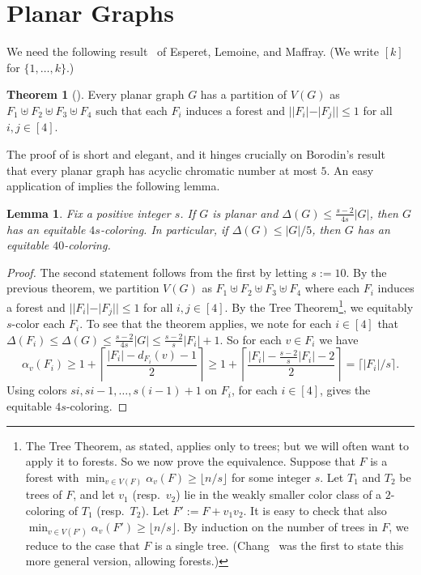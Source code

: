 \documentclass[11pt]{article}
\newtheorem{lem}{Lemma}
\theoremstyle{definition}
\newtheorem{thmA}{Theorem}
\newcommand\floor[1]{\lfloor#1\rfloor}
\newcommand\ceil[1]{\lceil#1\rceil}
\renewcommand\ge\geqslant
\renewcommand\le\leqslant
\begin{document}
\section{Planar Graphs}
\label{planar-sec}
We need the following result~\cite{ELM} of Esperet, Lemoine, and Maffray. (We write $[k]$ for $\{1,\ldots,k\}$.)
\begin{thmA}[\cite{ELM}]
	\label{ELM-thm}
	Every planar graph $G$ has a partition of $V(G)$ as $F_1\uplus F_2\uplus F_3\uplus F_4$ such that each $F_i$ induces a forest and 
	$||F_i|-|F_j||\le 1$ for all $i,j\in[4]$.
\end{thmA}
	The proof of  is short and elegant, and it hinges crucially on Borodin's result~\cite{borodin-5acyclic} that every planar graph has 
	acyclic chromatic number at most $5$.  An easy application of  implies the following lemma.
\begin{lem}
	Fix a positive integer $s$. If $G$ is planar and $\Delta(G)\le \frac{s-2}{4s}|G|$, then $G$ has an equitable $4s$-coloring.
	In particular, if $\Delta(G)\le |G|/5$, then $G$ has an equitable $40$-coloring.
	\label{planar-lem}
\end{lem}
\begin{proof}
	The second statement follows from the first by letting $s:=10$.
	By the previous theorem, we partition $V(G)$ as $F_1\uplus F_2\uplus F_3\uplus F_4$ where each $F_i$ induces a forest and $||F_i|-|F_j||\le 1$
	for all $i,j\in[4]$.  By the Tree Theorem\footnote{The Tree Theorem, as stated, applies only to trees; but we will often
want to apply it to forests.  So we now prove the equivalence.  Suppose that $F$ is a forest with $\min_{v\in V(F)}\alpha_v(F)\ge\floor{n/s}$ for 
some integer $s$.  Let $T_1$ and $T_2$ be trees of $F$, and let $v_1$ (resp.~$v_2$) lie in the weakly smaller color class of a $2$-coloring of $T_1$ 
(resp.~$T_2$).  Let $F':=F+v_1v_2$.  It is easy to check that also $\min_{v\in V(F')}\alpha_v(F')\ge \floor{n/s}$.  By induction on the number of trees in
$F$, we reduce to the case that $F$ is a single tree.  (Chang~\cite{chang} was the first to state this more general version, allowing forests.)}, we equitably $s$-color each $F_i$.  To see that the theorem applies, we note for each $i\in [4]$
	that $\Delta(F_i)\le \Delta(G)\le \frac{s-2}{4s}|G|\le \frac{s-2}s|F_i|+1$.  So for each $v\in F_i$ we have
	$$\alpha_v(F_i) \ge 1+\left\lceil\frac{|F_i|-d_{F_i}(v)-1}2\right\rceil\ge1 + \left\lceil\frac{|F_i| - \frac{s-2}{s}|F_i| - 2}2\right\rceil 
	= \ceil{|F_i|/s}.
	$$
	Using colors $si,si-1,\ldots,s(i-1)+1$ on $F_i$, for each $i\in[4]$, gives the equitable $4s$-coloring.
\end{proof}
\end{document}
